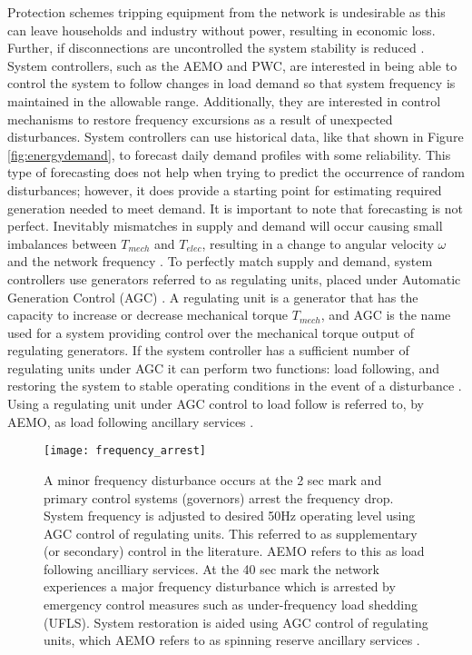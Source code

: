Protection schemes tripping equipment from the network is undesirable as this can leave households and industry without power, resulting in economic loss. Further, if disconnections are uncontrolled the system stability is reduced \cite{AEMOpowerfreqriskrev}. System controllers, such as the AEMO and PWC, are interested in being able to control the system to follow changes in load demand so that system frequency is maintained in the allowable range. Additionally, they are interested in control mechanisms to restore frequency excursions as a result of unexpected disturbances. System controllers can use historical data, like that shown in Figure \ref{fig:energydemand}, to forecast daily demand profiles with some reliability. This type of forecasting does not help when trying to predict the occurrence of random disturbances; however, it does provide a starting point for estimating required generation needed to meet demand. It is important to note that forecasting is not perfect. Inevitably mismatches in supply and demand will occur causing small imbalances between $T_{mech}$ and $T_{elec}$, resulting in a change to angular velocity $\omega$ and the network frequency \cite{Glover2012}. To perfectly match supply and demand, system controllers use generators referred to as regulating units, placed under Automatic Generation Control (AGC) \cite{Kothari2011}. A regulating unit is a generator that has the capacity to increase or decrease mechanical torque $T_{mech}$, and AGC is the name used for a system providing control over the mechanical torque output of regulating generators. If the system controller has a sufficient number of regulating units under AGC it can perform two functions: load following, and restoring the system to stable operating conditions in the event of a disturbance \cite{Grainger1994}. Using a regulating unit under AGC control to load follow is referred to, by AEMO, as load following ancillary services \cite{AEMOancilliaryserv}.

\begin{figure}[ht]
\centering
\texttt{[image: frequency\_arrest]}
\caption{A minor frequency disturbance occurs at the 2 sec mark and primary control systems (governors) arrest the frequency drop. System frequency is adjusted to desired 50$\si{\hertz}$ operating level using AGC control of regulating units. This referred to as supplementary (or secondary) control in the literature. AEMO refers to this as load following ancilliary services. At the 40 sec mark the network experiences a major frequency disturbance which is arrested by emergency control measures such as under-frequency load shedding (UFLS). System restoration is aided using AGC control of regulating units, which AEMO refers to as spinning reserve ancillary services \cite{Bevrani2011}.}
\label{fig:freqarrest}
\end{figure}

